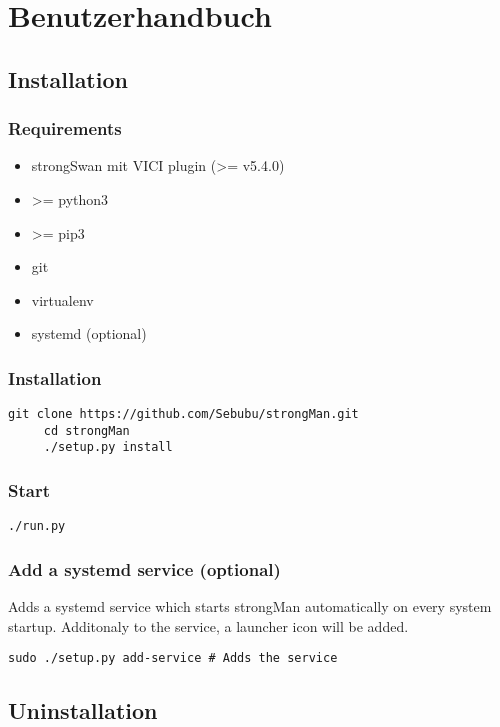 \section{Benutzerhandbuch}

\subsection{Installation}
\subsubsection{Requirements}
\begin{itemize}
	\item strongSwan mit VICI plugin (>= v5.4.0)
	\item >= python3
	\item >= pip3
	\item git
	\item virtualenv
	\item systemd (optional)
\end{itemize}
\subsubsection{Installation}
\begin{lstlisting}[style=BashInputStyle]
	 git clone https://github.com/Sebubu/strongMan.git
	 cd strongMan
	 ./setup.py install
\end{lstlisting}

\subsubsection{Start}
\begin{lstlisting}[style=BashInputStyle]
	 ./run.py
\end{lstlisting}

\subsubsection{Add a systemd service (optional)}
Adds a systemd service which starts strongMan automatically on every system startup. Additonaly to the service, a launcher icon will be added.
\begin{lstlisting}[style=BashInputStyle]
    sudo ./setup.py add-service # Adds the service
\end{lstlisting}

\subsection{Uninstallation}
